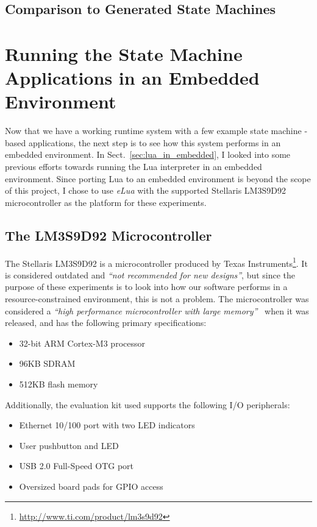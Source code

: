 \FloatBarrier
\subsection{Comparison to Generated State Machines}



\section{Running the State Machine Applications in an Embedded Environment}
\label{sec:running_on_micro}
Now that we have a working runtime system with a few example state machine -based applications, the next step is to see how this system performs in an embedded environment. In Sect.~\ref{sec:lua_in_embedded}, I looked into some previous efforts towards running the Lua interpreter in an embedded environment. Since porting Lua to an embedded environment is beyond the scope of this project, I chose to use \emph{eLua} with the supported Stellaris LM3S9D92 microcontroller as the platform for these experiments.

\subsection{The LM3S9D92 Microcontroller}
\label{sec:microcontroller}
The Stellaris LM3S9D92 is a microcontroller produced by Texas Instruments\footnote{\url{http://www.ti.com/product/lm3s9d92}}. It is considered outdated and \emph{``not recommended for new designs''}, but since the purpose of these experiments is to look into how our software performs in a resource-constrained environment, this is not a problem. The microcontroller was considered a \emph{``high performance microcontroller with large memory''}~\cite{website:stellaris_micro} when it was released, and has the following primary specifications:

\begin{itemize}
	\item 32-bit ARM Cortex-M3 processor
	\item 96KB SDRAM
	\item 512KB flash memory
\end{itemize}

Additionally, the evaluation kit used supports the following I/O peripherals:

\begin{itemize}
	\item Ethernet 10/100 port with two LED indicators
	\item User pushbutton and LED
	\item USB 2.0 Full-Speed OTG port
	\item Oversized board pads for GPIO access
\end{itemize}

